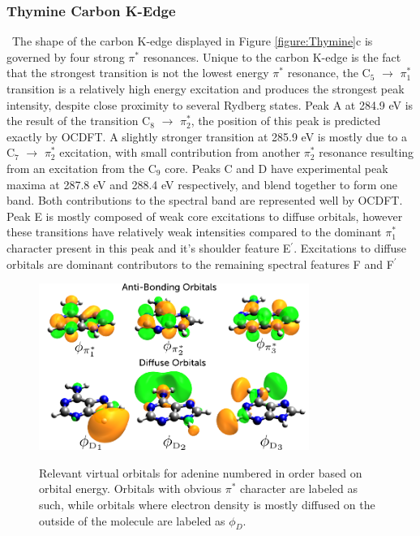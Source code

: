 \documentclass[8.5pt,twoside,twocolumn]{article}
\begin{document}
\subsubsection{Thymine Carbon K-Edge} \
   The shape of the carbon K-edge displayed in Figure \ref{figure:Thymine}c is governed by four strong $\pi^*$ resonances. Unique to the carbon K-edge is the fact that the strongest transition is not the lowest energy $\pi^*$ resonance, the C$_5$ $\rightarrow$ $\pi_1^*$ transition is a relatively high energy excitation and produces the strongest peak intensity, despite close proximity to several Rydberg states. Peak A at 284.9 eV is the result of the transition C$_8$ $\rightarrow$ $\pi_2^*$, the position of this peak is predicted exactly by OCDFT. A slightly stronger transition at 285.9 eV is mostly due to a  C$_7$ $\rightarrow$ $\pi_2^*$ excitation, with small contribution from another $\pi_2^*$ resonance resulting from an excitation from the C$_9$ core. Peaks C and D have experimental peak maxima at 287.8 eV and 288.4 eV respectively, and blend together to form one band. Both contributions to the spectral band are represented well by OCDFT.
Peak E is mostly composed of weak core excitations to diffuse orbitals, however these transitions have relatively weak intensities compared to the dominant $\pi_1^*$ character present in this peak and it's shoulder feature E$^{\prime}$. Excitations to diffuse orbitals are dominant contributors to the remaining spectral features F and F$^{\prime}$
\begin{figure}[!h]
\centering
\includegraphics[width=8.8cm]{AdenineVirtuals.png} \\
\caption{Relevant virtual orbitals for adenine numbered in order based on orbital energy. Orbitals with obvious $\pi^*$ character are labeled as such, while orbitals where electron density is mostly diffused on the outside of the molecule are labeled as $\phi_D$.}
\label{figure:adeninevirtuals} 
\end{figure}
\end{document}
